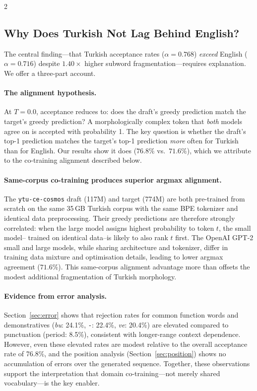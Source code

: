 \documentclass[11pt,a4paper]{article}
\begin{document}
\begin{multicols}{2}
\subsection{Why Does Turkish Not Lag Behind English?}
\label{sec:disc-turkey}

The central finding—that Turkish acceptance rates ($\alpha = 0.768$)
\emph{exceed} English ($\alpha = 0.716$) despite $1.40\!\times$ higher
subword fragmentation—requires explanation.
We offer a three-part account.

\paragraph{The alignment hypothesis.}
At $T=0.0$, acceptance reduces to: does the draft's greedy prediction
match the target's greedy prediction?
A morphologically complex token that \emph{both} models agree on is
accepted with probability 1.
The key question is whether the draft's top-1 prediction matches the
target's top-1 prediction \emph{more} often for Turkish than for English.
Our results show it does ($76.8\%$ vs.\ $71.6\%$), which we attribute to
the co-training alignment described below.

\paragraph{Same-corpus co-training produces superior argmax alignment.}
The \texttt{ytu-ce-cosmos} draft (117M) and target (774M) are both
pre-trained from scratch on the same 35\,GB Turkish corpus with the same
BPE tokenizer and identical data preprocessing.
Their greedy predictions are therefore strongly correlated: when the
large model assigns highest probability to token $t$, the small model--
trained on identical data--is likely to also rank $t$ first.
The OpenAI GPT-2 small and large models, while sharing architecture and
tokenizer, differ in training data mixture and optimisation details,
leading to lower argmax agreement ($71.6\%$).
This same-corpus alignment advantage more than offsets the modest
additional fragmentation of Turkish morphology.

\paragraph{Evidence from error analysis.}
Section~\ref{sec:error} shows that rejection rates for common function
words and demonstratives (\textit{bu}: 24.1\%, \texttt{-}: 22.4\%,
\textit{ve}: 20.4\%) are elevated compared to punctuation (period: 8.5\%),
consistent with longer-range context dependence.
However, even these elevated rates are modest relative to the overall
acceptance rate of 76.8\%, and the position analysis
(Section~\ref{sec:position}) shows no accumulation of errors over the
generated sequence.
Together, these observations support the interpretation that domain
co-training—not merely shared vocabulary—is the key enabler.


\end{multicols}
\end{document}
